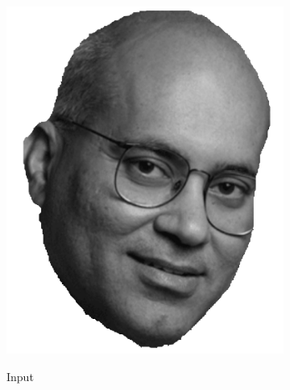 \begin{figure}
\begin{subfigure}{0.23\textwidth}
        \includegraphics[width=\textwidth]{statistical_normals/images/sirfs_borrowed/sirfs_input2}
\label{subfig:sirfs-2-input}
    \caption*{Input}
    \end{subfigure}
    \begin{subfigure}{0.23\textwidth}
        \centering

\end{subfigure}
\end{figure}
